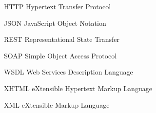 \begin{siglas}
  \item[HTTP] Hypertext Transfer Protocol
  \item[JSON] JavaScript Object Notation
  \item[REST] Representational State Transfer
  \item[SOAP] Simple Object Access Protocol
  \item[WSDL] Web Services Description Language
  \item[XHTML] eXtensible Hypertext Markup Language
  \item[XML] eXtensible Markup Language
\end{siglas}
